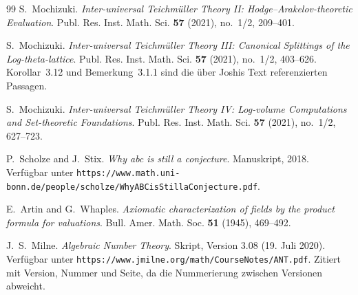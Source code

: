 \documentclass[11pt,a4paper]{article}
\theoremstyle{definition}
\theoremstyle{plain}
\theoremstyle{definition}
\begin{document}
\begin{thebibliography}{99}
S.~Mochizuki.
\newblock \emph{Inter-universal Teichmüller Theory II: Hodge--Arakelov-theoretic
Evaluation}.
\newblock Publ. Res. Inst. Math. Sci. \textbf{57} (2021), no.~1/2, 209--401.

S.~Mochizuki.
\newblock \emph{Inter-universal Teichmüller Theory III: Canonical Splittings of
the Log-theta-lattice}.
\newblock Publ. Res. Inst. Math. Sci. \textbf{57} (2021), no.~1/2, 403--626.
\newblock Korollar~3.12 und Bemerkung~3.1.1 sind die über Joshis Text
referenzierten Passagen.

S.~Mochizuki.
\newblock \emph{Inter-universal Teichmüller Theory IV: Log-volume Computations
and Set-theoretic Foundations}.
\newblock Publ. Res. Inst. Math. Sci. \textbf{57} (2021), no.~1/2, 627--723.

P.~Scholze and J.~Stix.
\newblock \emph{Why abc is still a conjecture}.
\newblock Manuskript, 2018. Verfügbar unter
\texttt{https://www.math.uni-bonn.de/people/scholze/WhyABCisStillaConjecture.pdf}.

E.~Artin and G.~Whaples.
\newblock \emph{Axiomatic characterization of fields by the product formula for
valuations}.
\newblock Bull. Amer. Math. Soc. \textbf{51} (1945), 469--492.

J.~S.~Milne.
\newblock \emph{Algebraic Number Theory}.
\newblock Skript, Version 3.08 (19. Juli 2020). Verfügbar unter
\texttt{https://www.jmilne.org/math/CourseNotes/ANT.pdf}. Zitiert mit Version,
Nummer und Seite, da die Nummerierung zwischen Versionen abweicht.


\end{thebibliography}
\end{document}
